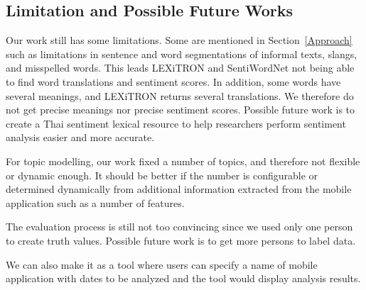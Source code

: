 \subsection*{Limitation and Possible Future Works}
Our work still has some limitations. Some are mentioned in Section~\ref{Approach} such as limitations in sentence and word segmentations of informal texts, slangs, and misspelled words. This leads LEXiTRON and  SentiWordNet not being able to find word translations and sentiment scores. In addition, some words have several meanings, and LEXiTRON returns several translations. We therefore do not get precise meanings nor precise sentiment scores. Possible future work is to create a Thai sentiment lexical resource to help researchers perform sentiment analysis easier and more accurate.

For topic modelling, our work fixed a number of topics, and therefore not flexible or dynamic enough. It should be better if the number is configurable or determined dynamically from additional information extracted from the mobile application such as a number of features.

The evaluation process is still not too convincing since we used only one person to create truth values. Possible future work is to get more persons to label data.

We can also make it as a tool where users can specify a name of mobile application with dates to be analyzed and the tool would display analysis results.



%
%


